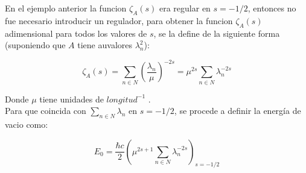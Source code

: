 En el ejemplo anterior la funcion $\zeta _A (s) $ era regular en $s= -1/2$, entonces no fue necesario introducir un regulador, para obtener la funcion $\zeta _A (s)$ adimensional para todos los valores de $s$, se la define de la siguiente forma (suponiendo que $A$ tiene auvalores $\lambda _n ^2 $):

\begin{equation}
\zeta _A (s) = \sum _{n \in N} \left( \frac{\lambda _n}{\mu }  \right) ^{-2s } = 
\mu ^{2s} \sum _{n \in N } \lambda _n ^{-2s}
\end{equation}

Donde $\mu $ tiene unidades de $longitud ^{-1}$ . \\

Para que coincida con $\underset{ {n \in N}}{  \sum } \lambda _n$ en $s= -1/2$, se procede a definir la energía de vacio como:

\begin{equation}
E _ 0 = 
\frac{\hbar c}{2 }
\left(
	\mu ^{2s+1} \sum _{n \in N} \lambda _n ^{-2s} 
	\right) _{s=-1/2}
\end{equation}
